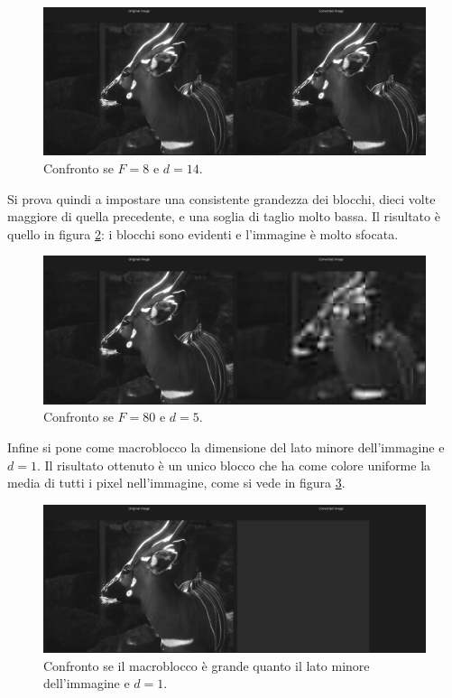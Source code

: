 \documentclass[12pt]{article}
\begin{document}
\begin{figure}[!ht]
    \begin{center}
    \includegraphics[width=\textwidth]{images/deer-8-14.png}
    \caption{Confronto se $F=8$ e $d=14$.}
    \label{fig:d814}
    \end{center}
\end{figure}

Si prova quindi a impostare una consistente grandezza dei blocchi, dieci volte maggiore di quella precedente, e una soglia di taglio molto bassa. Il risultato è quello in figura \ref{fig:d805}: i blocchi sono evidenti e l'immagine è molto sfocata.

\begin{figure}[!ht]
    \begin{center}
    \includegraphics[width=\textwidth]{images/deer-80-5.png}
    \caption{Confronto se $F=80$ e $d=5$.}
    \label{fig:d805}
    \end{center}
\end{figure}

Infine si pone come macroblocco la dimensione del lato minore dell'immagine e $d=1$. Il risultato ottenuto è un unico blocco che ha come colore uniforme la media di tutti i pixel nell'immagine, come si vede in figura \ref{fig:dall1}.

\begin{figure}[!ht]
    \begin{center}
    \includegraphics[width=\textwidth]{images/deer-all-1.png}
    \caption{Confronto se il macroblocco è grande quanto il lato minore dell'immagine e $d=1$.}
    \label{fig:dall1}
    \end{center}
\end{figure}
\end{document}

